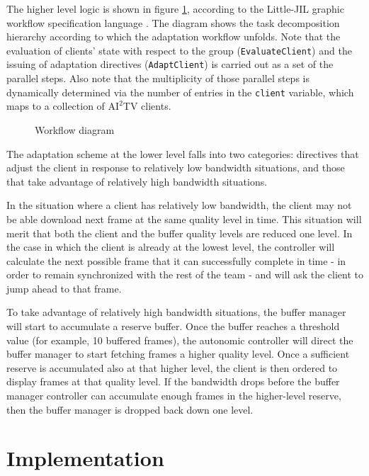 \documentclass{sig-alternate}
\begin{document}
The higher level logic is shown in figure \ref{ljil}, according to the
Little-JIL graphic workflow specification language \cite{LJIL}.  The
diagram shows the task decomposition hierarchy according to which the
adaptation workflow unfolds.  Note that the evaluation of clients'
state with respect to the group (\texttt{EvaluateClient}) and the
issuing of adaptation directives (\texttt{AdaptClient}) is carried out
as a set of the parallel steps.  Also note that the multiplicity of
those parallel steps is dynamically determined via the number of
entries in the \texttt{client} variable, which maps to a collection of
$\mathrm{AI}^2$TV clients.

%
%

\begin{figure} 
  \centering
  \hspace*{-5mm}
  \caption{Workflow diagram }
  \label{ljil}
\end{figure}

The adaptation scheme at the lower level falls into two categories:
directives that adjust the client in response to relatively low
bandwidth situations, and those that take advantage of relatively high
bandwidth situations.

In the situation where a client has relatively low bandwidth, the
client may not be able download next frame at the same quality level
in time.  This situation will merit that both the client and the
buffer quality levels are reduced one level. In the case in which the
client is already at the lowest level, the controller will calculate
the next possible frame that it can successfully complete in time - in
order to remain synchronized with the rest of the team - and will ask
the client to jump ahead to that frame.

To take advantage of relatively high bandwidth situations, the buffer
manager will start to accumulate a reserve buffer.  Once the buffer
reaches a threshold value (for example, 10 buffered frames), the
autonomic controller will direct the buffer manager to start fetching
frames a higher quality level.  Once a sufficient reserve is
accumulated also at that higher level, the client is then ordered to
display frames at that quality level.  If the bandwidth drops before
the buffer manager controller can accumulate enough frames in the
higher-level reserve, then the buffer manager is dropped back down one
level.

\section{Implementation} \label{implementation}
\end{document}
